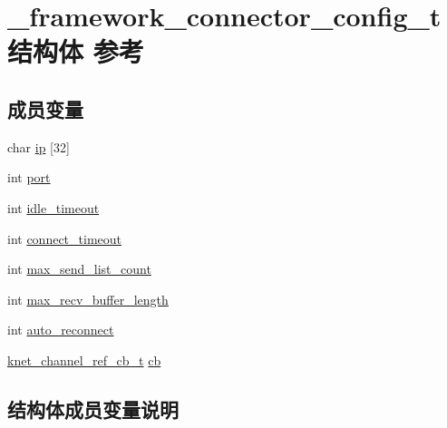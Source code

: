 \hypertarget{a00013}{}\section{\+\_\+framework\+\_\+connector\+\_\+config\+\_\+t结构体 参考}
\label{a00013}
\subsection*{成员变量}
\begin{DoxyCompactItemize}
\item 
char \hyperlink{a00013_a09a135e761eb026e64952e76ca193c1b_a09a135e761eb026e64952e76ca193c1b}{ip} \mbox{[}32\mbox{]}
\item 
int \hyperlink{a00013_a5427527be42630baf3fc0497e74e4d4d_a5427527be42630baf3fc0497e74e4d4d}{port}
\item 
int \hyperlink{a00013_a103e36450fc30baa72acc26b7efd5b98_a103e36450fc30baa72acc26b7efd5b98}{idle\+\_\+timeout}
\item 
int \hyperlink{a00013_a02f7315d98e5e2872fde99130da6b7c8_a02f7315d98e5e2872fde99130da6b7c8}{connect\+\_\+timeout}
\item 
int \hyperlink{a00013_ac6e964a4a4ca24a176016275955a4e05_ac6e964a4a4ca24a176016275955a4e05}{max\+\_\+send\+\_\+list\+\_\+count}
\item 
int \hyperlink{a00013_a7f803ef991aaf690e9b3585c423511d1_a7f803ef991aaf690e9b3585c423511d1}{max\+\_\+recv\+\_\+buffer\+\_\+length}
\item 
int \hyperlink{a00013_a1e36fbcd619adeff0b334ed609b8685e_a1e36fbcd619adeff0b334ed609b8685e}{auto\+\_\+reconnect}
\item 
\hyperlink{a00053_a8a7d96123ef4565c6d08fe58a10476a9_a8a7d96123ef4565c6d08fe58a10476a9}{knet\+\_\+channel\+\_\+ref\+\_\+cb\+\_\+t} \hyperlink{a00013_ab08fced06b6e8f0dda28e4f1d09ad027_ab08fced06b6e8f0dda28e4f1d09ad027}{cb}
\end{DoxyCompactItemize}


\subsection{结构体成员变量说明}
\hypertarget{a00013_a1e36fbcd619adeff0b334ed609b8685e_a1e36fbcd619adeff0b334ed609b8685e}{}
